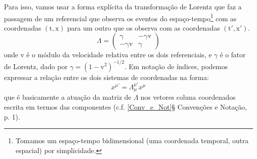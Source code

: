 \documentclass[12pt,a4paper]{article}
\begin{document}
Para isso, vamos   usar a forma explícita da transformação de Lorentz que faz a passagem de
um referencial que observa os eventos do espaço-tempo\footnote{Tomamos um espaço-tempo bidimensional (uma coordenada temporal, outra espacial) por simplicidade.} com as coordenadas $\mathrm{(t,x)}$ para um outro que
os observa com as coordenadas $\mathrm{(t',x')}$.
\begin{equation}
  \Lambda = \begin{pmatrix*} \mathrm{\gamma} &  \mathrm{-\gamma v}\\
                          \mathrm{-\gamma v} & \mathrm{\gamma}  \end{pmatrix*}
  \label{4}
\end{equation}
onde $\mathrm{v}$ é o módulo da velocidade relativa entre os dois referenciais, e $\gamma$ é o fator de Lorentz, dado por
$\gamma = \mathrm{(1-v^2)^{-1/2}}$. Em notação de índices, podemos expressar a relação entre os dois sistemas 
de coordenadas na forma:
\begin{equation*}
x^{\mu'} = \Lambda^{\mu'}_{\mu} x^{\mu}
\end{equation*}
que é basicamente a atuação da matriz de $\Lambda$ nos vetores coluna coordenados escrita em termos das componentes (c.f. \ref{Conv_e_Not}{§ Convenções e Notação}, p. 1).
\end{document}
